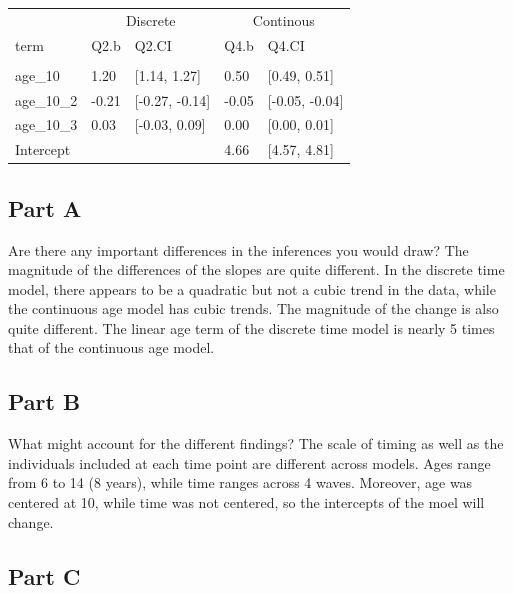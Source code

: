 \documentclass[]{article}
\begin{document}
\begin{table}[H]
\centering
\begin{tabular}{lllll}
\toprule
\multicolumn{1}{c}{ } & \multicolumn{2}{c}{Discrete} & \multicolumn{2}{c}{Continous} \\
\cmidrule(l{2pt}r{2pt}){2-3} \cmidrule(l{2pt}r{2pt}){4-5}
term & Q2.b & Q2.CI & Q4.b & Q4.CI\\
\midrule
\addlinespace[0.3em]
\multicolumn{5}{l}{\textbf{Fixed}}\\
\hspace{1em}age\_10 & 1.20 & [1.14, 1.27] & 0.50 & [0.49, 0.51]\\
\hspace{1em}age\_10\_2 & -0.21 & [-0.27, -0.14] & -0.05 & [-0.05, -0.04]\\
\hspace{1em}age\_10\_3 & 0.03 & [-0.03, 0.09] & 0.00 & [0.00, 0.01]\\
\hspace{1em}Intercept &  &  & 4.66 & [4.57, 4.81]\\
\bottomrule
\end{tabular}
\end{table}

\subsection{Part A}\label{part-a-2}

Are there any important differences in the inferences you would draw?
The magnitude of the differences of the slopes are quite different. In
the discrete time model, there appears to be a quadratic but not a cubic
trend in the data, while the continuous age model has cubic trends. The
magnitude of the change is also quite different. The linear age term of
the discrete time model is nearly 5 times that of the continuous age
model.

\subsection{Part B}\label{part-b-2}

What might account for the different findings? The scale of timing as
well as the individuals included at each time point are different across
models. Ages range from 6 to 14 (8 years), while time ranges across 4
waves. Moreover, age was centered at 10, while time was not centered, so
the intercepts of the moel will change.

\subsection{Part C}\label{part-c-1}
\end{document}
